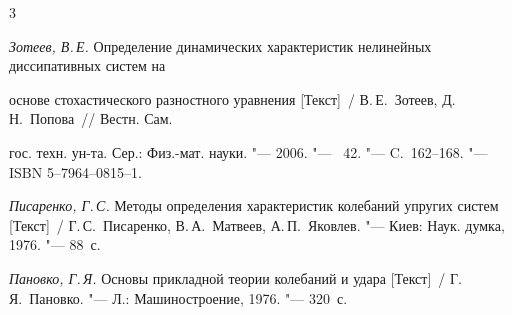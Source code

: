 \begin{thebibliography}{3}


\item \textit{Зотеев, В.\,Е.} Определение динамических характеристик нелинейных диссипативных систем на 


основе стохастического разностного уравнения [Текст]~/ В.\,Е.~Зотеев, Д.\,Н.~Попова~/\!/ Вестн. Сам.


гос. техн. ун-та. Сер.: Физ.-мат. науки. "---  2006. "---  \No~42. "---  C.~162--168. "--- ISBN 5--7964--0815--1.





\item \textit{Писаренко, Г.\,С.} Методы определения характеристик колебаний упругих систем [Текст]~/ Г.\,С.~Писаренко, В.\,А.~Матвеев, А.\,П.~Яковлев. "--- Киев: Наук. думка, 1976. "--- 88~с.





\item \textit{Пановко, Г.\,Я.} Основы прикладной теории колебаний и удара [Текст]~/ Г.\,Я.~Пановко. "--- Л.: Машиностроение, 1976. "--- 320~с.


  


\end{thebibliography}





\vspace{8mm}


\lfoot[]{}


  \rfoot[]{}





\makeengtitle












%


